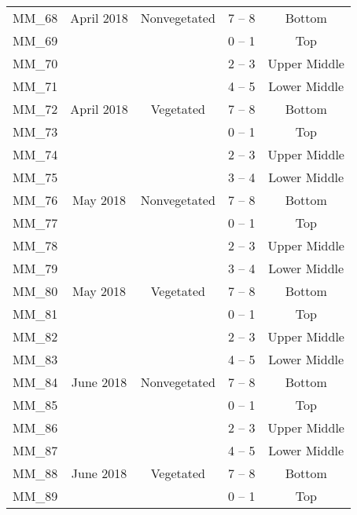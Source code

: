 \documentclass[
  12 pt,
]{article}
\begin{document}
\begin{singlespace}
\begin{longtable}[t]{ccccc}
\nopagebreak
MM\_68 & \multirow{-4}{*}{\centering\arraybackslash 23 April 2018} & \multirow{-4}{*}{\centering\arraybackslash Nonvegetated} & 7 – 8 & Bottom\\
\cmidrule{1-5}\pagebreak[0]
MM\_69 &  &  & 0 – 1 & Top\\
\nopagebreak
MM\_70 &  &  & 2 – 3 & Upper Middle\\
\nopagebreak
MM\_71 &  &  & 4 – 5 & Lower Middle\\
\nopagebreak
MM\_72 & \multirow{-4}{*}{\centering\arraybackslash 23 April 2018} & \multirow{-4}{*}{\centering\arraybackslash Vegetated} & 7 – 8 & Bottom\\
\cmidrule{1-5}\pagebreak[0]
MM\_73 &  &  & 0 – 1 & Top\\
\nopagebreak
MM\_74 &  &  & 2 – 3 & Upper Middle\\
\nopagebreak
MM\_75 &  &  & 3 – 4 & Lower Middle\\
\nopagebreak
MM\_76 & \multirow{-4}{*}{\centering\arraybackslash 21 May 2018} & \multirow{-4}{*}{\centering\arraybackslash Nonvegetated} & 7 – 8 & Bottom\\
\cmidrule{1-5}\pagebreak[0]
MM\_77 &  &  & 0 – 1 & Top\\
\nopagebreak
MM\_78 &  &  & 2 – 3 & Upper Middle\\
\nopagebreak
MM\_79 &  &  & 3 – 4 & Lower Middle\\
\nopagebreak
MM\_80 & \multirow{-4}{*}{\centering\arraybackslash 21 May 2018} & \multirow{-4}{*}{\centering\arraybackslash Vegetated} & 7 – 8 & Bottom\\
\cmidrule{1-5}\pagebreak[0]
MM\_81 &  &  & 0 – 1 & Top\\
\nopagebreak
MM\_82 &  &  & 2 – 3 & Upper Middle\\
\nopagebreak
MM\_83 &  &  & 4 – 5 & Lower Middle\\
\nopagebreak
MM\_84 & \multirow{-4}{*}{\centering\arraybackslash 18 June 2018} & \multirow{-4}{*}{\centering\arraybackslash Nonvegetated} & 7 – 8 & Bottom\\
\cmidrule{1-5}\pagebreak[0]
MM\_85 &  &  & 0 – 1 & Top\\
\nopagebreak
MM\_86 &  &  & 2 – 3 & Upper Middle\\
\nopagebreak
MM\_87 &  &  & 4 – 5 & Lower Middle\\
\nopagebreak
MM\_88 & \multirow{-4}{*}{\centering\arraybackslash 18 June 2018} & \multirow{-4}{*}{\centering\arraybackslash Vegetated} & 7 – 8 & Bottom\\
\cmidrule{1-5}\pagebreak[0]
MM\_89 &  &  & 0 – 1 & Top\\

\end{longtable}
\end{singlespace}
\end{document}
